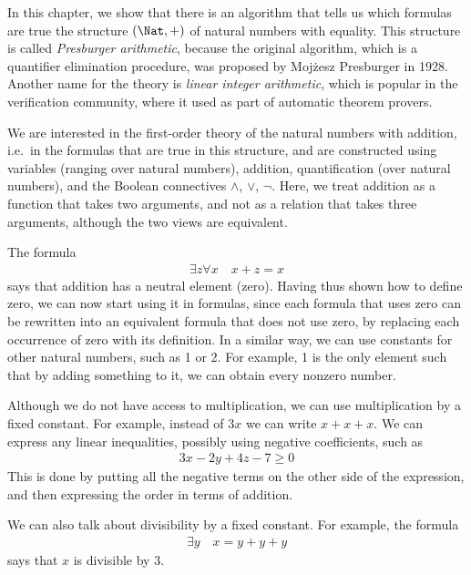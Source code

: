 \label{sec:presburger}

In this chapter, we show that there is an algorithm that tells us which formulas are true the structure $(\Nat, +)$ of natural numbers with equality. This structure is called \emph{Presburger arithmetic}, because the original algorithm, which is a quantifier elimination procedure,  was proposed by Mojżesz Presburger in 1928.  Another name for the theory is \emph{linear integer arithmetic}, which is popular in the verification community, where it used as part of automatic theorem provers. 


We are interested in the first-order theory of the natural numbers with addition, i.e.~in the formulas that are true in this structure, and are constructed using variables (ranging over natural numbers), addition, quantification (over natural numbers), and the Boolean connectives $\land$, $\lor$, $\neg$. Here, we treat addition as a function that takes two arguments, and not as a relation that takes three arguments, although the two views are equivalent.

\begin{example}[Zero]
	The formula 
	\begin{align*}
	\exists z \forall x \quad x + z = x
	\end{align*}
	says that addition has a neutral element (zero). Having thus shown how to define zero, we can now start using it in formulas, since each formula that uses zero can be rewritten into an equivalent formula that does not use zero, by replacing each occurrence of zero with its definition. In a similar way, we can use constants for other natural numbers, such as 1 or 2. For example, 1 is the only element such that by adding something to it, we can obtain every nonzero number. 
\end{example}

\begin{example} Although we do not have access to multiplication, we can use multiplication by a fixed constant. For example, instead of $3x$ we can write $x + x + x$.
	We can express any linear inequalities, possibly using negative coefficients, such as 
	\begin{align*}
	3x - 2y + 4z - 7 \ge 0
	\end{align*}
	This is done by putting all the negative terms on the other side of the expression, and then expressing the order in terms of addition.
\end{example}

\begin{example}[Divisibility]
We can also talk about divisibility by a fixed constant. For example, the formula
\begin{align*}
	\exists y  \quad  x  = y + y + y
\end{align*}
says that $x$ is divisible by 3. 
\end{example}


